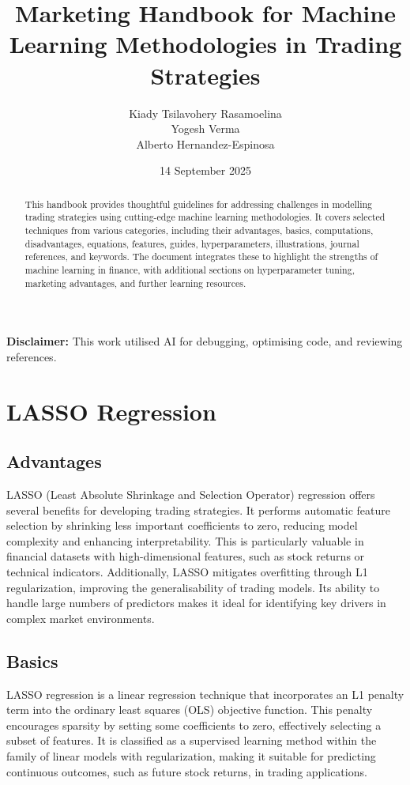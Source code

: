 \documentclass{article}
\title{Marketing Handbook for Machine Learning Methodologies in Trading Strategies}
\author{Kiady Tsilavohery Rasamoelina\\
Yogesh Verma\\
Alberto Hernandez-Espinosa}
\date{14 September 2025}
\begin{document}
\maketitle

\begin{abstract}
This handbook provides thoughtful guidelines for addressing challenges in modelling trading strategies using cutting-edge machine learning methodologies. It covers selected techniques from various categories, including their advantages, basics, computations, disadvantages, equations, features, guides, hyperparameters, illustrations, journal references, and keywords. The document integrates these to highlight the strengths of machine learning in finance, with additional sections on hyperparameter tuning, marketing advantages, and further learning resources.
\end{abstract}

\noindent \textbf{Disclaimer:} This work utilised AI for debugging, optimising code, and reviewing references.

\section{LASSO Regression}
\label{sec:lasso}

\subsection{Advantages}
LASSO (Least Absolute Shrinkage and Selection Operator) regression offers several benefits for developing trading strategies. It performs automatic feature selection by shrinking less important coefficients to zero, reducing model complexity and enhancing interpretability. This is particularly valuable in financial datasets with high-dimensional features, such as stock returns or technical indicators. Additionally, LASSO mitigates overfitting through L1 regularization, improving the generalisability of trading models. Its ability to handle large numbers of predictors makes it ideal for identifying key drivers in complex market environments.

\subsection{Basics}
LASSO regression is a linear regression technique that incorporates an L1 penalty term into the ordinary least squares (OLS) objective function. This penalty encourages sparsity by setting some coefficients to zero, effectively selecting a subset of features. It is classified as a supervised learning method within the family of linear models with regularization, making it suitable for predicting continuous outcomes, such as future stock returns, in trading applications.
\end{document}
